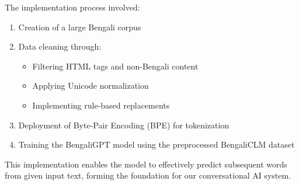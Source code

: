 The implementation process involved:
\begin{enumerate}
    \item Creation of a large Bengali corpus
    \item Data cleaning through:
    \begin{itemize}
        \item Filtering HTML tags and non-Bengali content
        \item Applying Unicode normalization
        \item Implementing rule-based replacements
    \end{itemize}
    \item Deployment of Byte-Pair Encoding (BPE) for tokenization
    \item Training the BengaliGPT model using the preprocessed BengaliCLM dataset
\end{enumerate}

This implementation enables the model to effectively predict subsequent words from given input text, forming the foundation for our conversational AI system.